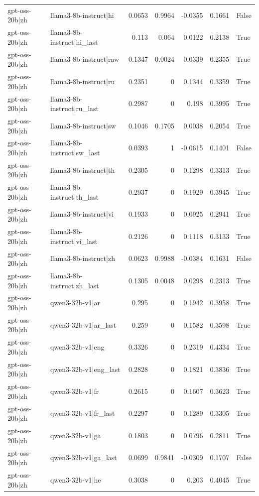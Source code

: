 \begin{table}
\begin{tabular}{l l r r r r l}
gpt-oss-20b|zh & llama3-8b-instruct|hi & 0.0653 & 0.9964 & -0.0355 & 0.1661 & False \\
gpt-oss-20b|zh & llama3-8b-instruct|hi_last & 0.113 & 0.064 & 0.0122 & 0.2138 & True \\
gpt-oss-20b|zh & llama3-8b-instruct|raw & 0.1347 & 0.0024 & 0.0339 & 0.2355 & True \\
gpt-oss-20b|zh & llama3-8b-instruct|ru & 0.2351 & 0 & 0.1344 & 0.3359 & True \\
gpt-oss-20b|zh & llama3-8b-instruct|ru_last & 0.2987 & 0 & 0.198 & 0.3995 & True \\
gpt-oss-20b|zh & llama3-8b-instruct|sw & 0.1046 & 0.1705 & 0.0038 & 0.2054 & True \\
gpt-oss-20b|zh & llama3-8b-instruct|sw_last & 0.0393 & 1 & -0.0615 & 0.1401 & False \\
gpt-oss-20b|zh & llama3-8b-instruct|th & 0.2305 & 0 & 0.1298 & 0.3313 & True \\
gpt-oss-20b|zh & llama3-8b-instruct|th_last & 0.2937 & 0 & 0.1929 & 0.3945 & True \\
gpt-oss-20b|zh & llama3-8b-instruct|vi & 0.1933 & 0 & 0.0925 & 0.2941 & True \\
gpt-oss-20b|zh & llama3-8b-instruct|vi_last & 0.2126 & 0 & 0.1118 & 0.3133 & True \\
gpt-oss-20b|zh & llama3-8b-instruct|zh & 0.0623 & 0.9988 & -0.0384 & 0.1631 & False \\
gpt-oss-20b|zh & llama3-8b-instruct|zh_last & 0.1305 & 0.0048 & 0.0298 & 0.2313 & True \\
gpt-oss-20b|zh & qwen3-32b-v1|ar & 0.295 & 0 & 0.1942 & 0.3958 & True \\
gpt-oss-20b|zh & qwen3-32b-v1|ar_last & 0.259 & 0 & 0.1582 & 0.3598 & True \\
gpt-oss-20b|zh & qwen3-32b-v1|eng & 0.3326 & 0 & 0.2319 & 0.4334 & True \\
gpt-oss-20b|zh & qwen3-32b-v1|eng_last & 0.2828 & 0 & 0.1821 & 0.3836 & True \\
gpt-oss-20b|zh & qwen3-32b-v1|fr & 0.2615 & 0 & 0.1607 & 0.3623 & True \\
gpt-oss-20b|zh & qwen3-32b-v1|fr_last & 0.2297 & 0 & 0.1289 & 0.3305 & True \\
gpt-oss-20b|zh & qwen3-32b-v1|ga & 0.1803 & 0 & 0.0796 & 0.2811 & True \\
gpt-oss-20b|zh & qwen3-32b-v1|ga_last & 0.0699 & 0.9841 & -0.0309 & 0.1707 & False \\
gpt-oss-20b|zh & qwen3-32b-v1|he & 0.3038 & 0 & 0.203 & 0.4045 & True \\

\end{tabular}
\end{table}
